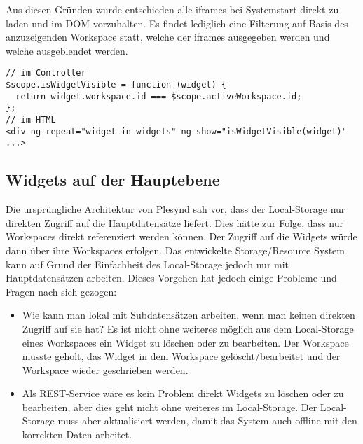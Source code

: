 Aus diesen Gründen wurde entschieden alle iframes bei Systemstart direkt zu laden und im DOM vorzuhalten. Es findet lediglich eine Filterung auf Basis des anzuzeigenden Workspace statt, welche der iframes ausgegeben werden und welche ausgeblendet werden.
\begin{lstlisting}
// im Controller
$scope.isWidgetVisible = function (widget) {
  return widget.workspace.id === $scope.activeWorkspace.id;
};
// im HTML
<div ng-repeat="widget in widgets" ng-show="isWidgetVisible(widget)" ...>
\end{lstlisting}

\subsection{Widgets auf der Hauptebene}
Die ursprüngliche Architektur von Plesynd sah vor, dass der Local-Storage nur direkten Zugriff auf die Hauptdatensätze liefert. Dies hätte zur Folge, dass nur Workspaces direkt referenziert werden können. Der Zugriff auf die Widgets würde dann über ihre Workspaces erfolgen. Das entwickelte Storage/Resource System kann auf Grund der Einfachheit des Local-Storage jedoch nur mit Hauptdatensätzen arbeiten. Dieses Vorgehen hat jedoch einige Probleme und Fragen nach sich gezogen: 
\begin{itemize}
 \item Wie kann man lokal mit Subdatensätzen arbeiten, wenn man keinen direkten Zugriff auf sie hat? Es ist nicht ohne weiteres möglich aus dem Local-Storage eines Workspaces ein Widget zu löschen oder zu bearbeiten. Der Workspace müsste geholt, das Widget in dem Workspace gelöscht/bearbeitet und der Workspace wieder geschrieben werden. 
 \item Als REST-Service wäre es kein Problem direkt Widgets zu löschen oder zu bearbeiten, aber dies geht nicht ohne weiteres im Local-Storage. Der Local-Storage muss aber aktualisiert werden, damit das System auch offline mit den korrekten Daten arbeitet.
\end{itemize} 

